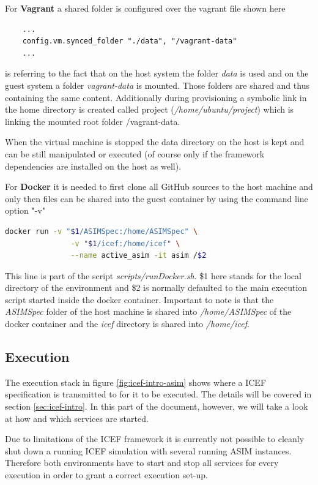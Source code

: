 For \textbf{Vagrant} a shared folder is configured over the vagrant file shown here

\begin{lstlisting}
	...
	config.vm.synced_folder "./data", "/vagrant-data"
	...
\end{lstlisting}

is referring to the fact that on the host system the folder \textit{data} is used and on the guest system a folder \textit{vagrant-data} is mounted. Those folders are shared and thus containing the same content. Additionally during provisioning a symbolic link in the home directory is created called project (\textit{/home/ubuntu/project}) which is linking the mounted root folder /vagrant-data.

When the virtual machine is stopped the data directory on the host is kept and can be still manipulated or executed (of course only if the framework dependencies are installed on the host as well).

For \textbf{Docker} it is needed to first clone all GitHub sources to the host machine and only then files can be shared into the guest container by using the command line option "-v"

\begin{lstlisting}[language=bash]
	docker run -v "$1/ASIMSpec:/home/ASIMSpec" \
	           -v "$1/icef:/home/icef" \
	           --name active_asim -it asim /$2
\end{lstlisting}

This line is part of the script \textit{scripts/runDocker.sh}. \$1 here stands for the local directory of the environment and \$2 is normally defaulted to the main execution script started inside the docker container. Important to note is that the \textit{ASIMSpec} folder of the host machine is shared into \textit{/home/ASIMSpec} of the docker container and the \textit{icef} directory is shared into \textit{/home/icef}.

\subsection{Execution}
\label{sec:env-exec-stack-exe}

The execution stack in figure \ref{fig:icef-intro-asim} shows where a ICEF specification is transmitted to for it to be executed. The details will be covered in section \ref{sec:icef-intro}. In this part of the document, however, we will take a look at how and which services are started.

Due to limitations of the ICEF framework it is currently not possible to cleanly shut down a running ICEF simulation with several running ASIM instances. Therefore both environments have to start and stop all services for every execution in order to grant a correct execution set-up.

